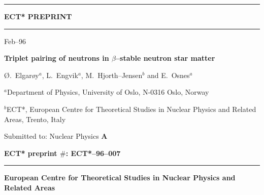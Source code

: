 


\thispagestyle{empty}
\newcommand{\HRule}{\rule{\linewidth}{1mm}}
\setlength{\parindent}{0mm}
\setlength{\parskip}{0mm}


   \HRule
     \begin{center}
         \Huge {\bf ECT* PREPRINT}
     \end{center}
   \HRule
   \flushright Feb--96
   \begin{center}
      \Large {\bf Triplet pairing of neutrons in $\beta$--stable  
       neutron star matter}
   \end{center}
   \begin{center}
      \large \O.\ Elgar\o y$^a$, L.\ Engvik$^a$, M.\ Hjorth--Jensen$^b$
       and E.\ Osnes$^a$
    \end{center}
    \begin{center}
     \large $^a$Department of Physics, University of Oslo, N-0316 Oslo,
     Norway
    \end{center}
    \begin{center}
      \large   $^b$ECT*, European Centre for Theoretical
        Studies in Nuclear Physics and Related Areas,
        Trento, Italy
    \end{center}
    \begin{center}
      \large   Submitted to:  Nuclear Physics {\bf A}
    \end{center}
    \begin{center}
        \Large {\bf ECT* preprint $\#$: ECT*--96--007}
    \end{center}
    \begin{figure}[hbtp]
        \begin{center}
        {\centering\mbox{}}
        \end{center}
     \end{figure}
    \HRule
    \begin{center}
        \Large {\bf European Centre for Theoretical Studies in Nuclear
        Physics and Related Areas}
    \end{center}
